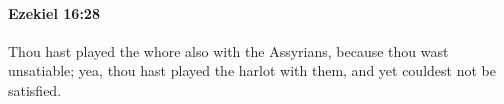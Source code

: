
		\paragraph{Ezekiel 16:28} %
			\label{EZEKIEL-16-28}

			Thou hast played the whore also with the Assyrians, because thou wast unsatiable; yea, thou hast played the harlot with them, and yet couldest not be satisfied.


